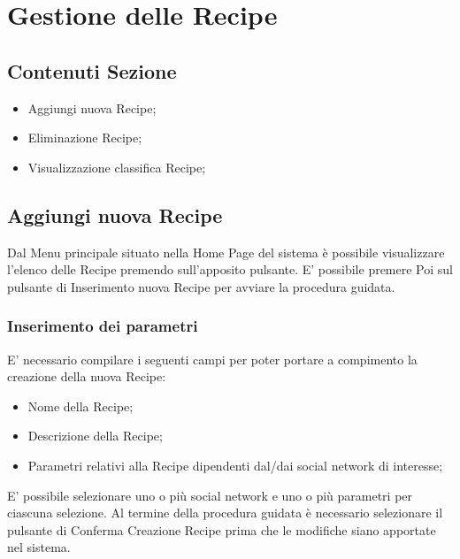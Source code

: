 %

\section{Gestione delle Recipe} %
\label{sec:gestione_delle_recipe}
	\subsection{Contenuti Sezione} %
	\label{sub:contenuti_sezione}
	\begin{itemize}
		\item Aggiungi nuova Recipe;
		\item Eliminazione Recipe;
		\item Visualizzazione classifica Recipe;
	\end{itemize}

	\subsection{Aggiungi nuova Recipe}
	Dal Menu principale situato nella Home Page del sistema è possibile visualizzare l'elenco delle Recipe premendo sull'apposito pulsante.
	E' possibile premere Poi sul pulsante di Inserimento nuova Recipe per avviare la procedura guidata.
		\subsubsection{Inserimento dei parametri}
		E' necessario compilare i seguenti campi per poter portare a compimento la creazione della nuova Recipe:
		\begin{itemize}
			\item Nome della Recipe;
			\item Descrizione della Recipe;
			\item Parametri relativi alla Recipe dipendenti dal/dai social network di interesse;
		\end{itemize}
		E' possibile selezionare uno o più social network e uno o più parametri per ciascuna selezione.
		\newline
		Al termine della procedura guidata è necessario selezionare il pulsante di Conferma Creazione Recipe prima che le modifiche siano apportate nel sistema.
	
